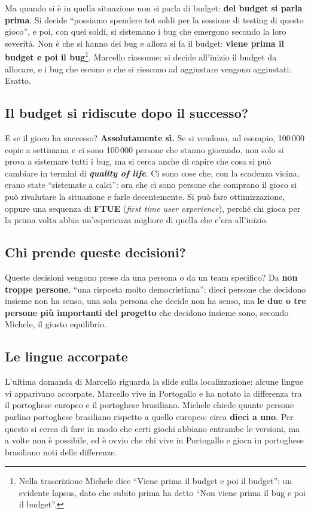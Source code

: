 Ma quando si è in quella situazione non si parla di budget: \textbf{del budget
si parla prima}. Si decide ``possiamo spendere tot soldi per la sessione di
testing di questo gioco'', e poi, con quei soldi, si sistemano i bug che
emergono secondo la loro severità. Non è che si hanno dei bug e allora si fa il
budget: \textbf{viene prima il budget e poi il bug}\footnote{Nella trascrizione
Michele dice ``Viene prima il budget e poi il budget'': un evidente lapsus, dato
che subito prima ha detto ``Non viene prima il bug e poi il budget''.}. Marcello
riassume: si decide all'inizio il budget da allocare, e i bug che escono e che si
riescono ad aggiustare vengono aggiustati. Esatto.

\subsection{Il budget si ridiscute dopo il successo?}

E se il gioco ha successo? \textbf{Assolutamente sì.} Se si vendono, ad esempio,
100\,000 copie a settimana e ci sono 100\,000 persone che stanno giocando, non
solo si prova a sistemare tutti i bug, ma si cerca anche di capire che cosa si
può cambiare in termini di \textbf{\emph{quality of life}}. Ci sono cose che,
con la scadenza vicina, erano state ``sistemate a calci'': ora che ci sono
persone che comprano il gioco si può rivalutare la situazione e farle
decentemente. Si può fare ottimizzazione, oppure una sequenza di \textbf{FTUE}
(\emph{first time user experience}), perché chi gioca per la prima volta abbia
un'esperienza migliore di quella che c'era all'inizio.

\subsection{Chi prende queste decisioni?}

Queste decisioni vengono prese da una persona o da un team specifico? Da
\textbf{non troppe persone}, ``una risposta molto democristiana'': dieci persone
che decidono insieme non ha senso, una sola persona che decide non ha senso, ma
\textbf{le due o tre persone più importanti del progetto} che decidono insieme
sono, secondo Michele, il giusto equilibrio.

\subsection{Le lingue accorpate}

L'ultima domanda di Marcello riguarda la slide sulla localizzazione: alcune
lingue vi apparivano accorpate. Marcello vive in Portogallo e ha notato la
differenza tra il portoghese europeo e il portoghese brasiliano. Michele chiede
quante persone parlino portoghese brasiliano rispetto a quello europeo: circa
\textbf{dieci a uno}. Per questo si cerca di fare in modo che certi giochi abbiano
entrambe le versioni, ma a volte non è possibile, ed è ovvio che chi vive in
Portogallo e gioca in portoghese brasiliano noti delle differenze.

